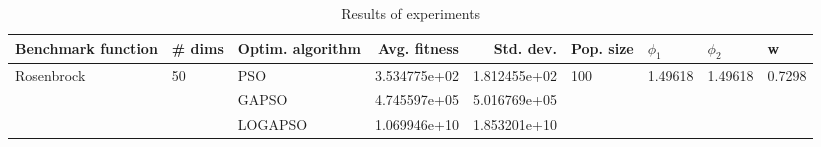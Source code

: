 \begin{table}
\centering
\caption{Results of experiments}
\begin{tabular}{lllrrllll}
\toprule
         Benchmark function &             \# dims & Optim. algorithm &  Avg. fitness &    Std. dev. &            Pop. size &               $\phi_{1}$ &               $\phi_{2}$ &                       w \\
\midrule
\multirow{3}{*}{Rosenbrock} & \multirow{3}{*}{50} &              PSO &  3.534775e+02 & 1.812455e+02 & \multirow{3}{*}{100} & \multirow{3}{*}{1.49618} & \multirow{3}{*}{1.49618} & \multirow{3}{*}{0.7298} \\
                            &                     &            GAPSO &  4.745597e+05 & 5.016769e+05 &                      &                          &                          &                         \\
                            &                     &          LOGAPSO &  1.069946e+10 & 1.853201e+10 &                      &                          &                          &                         \\
\bottomrule
\end{tabular}
\end{table}
